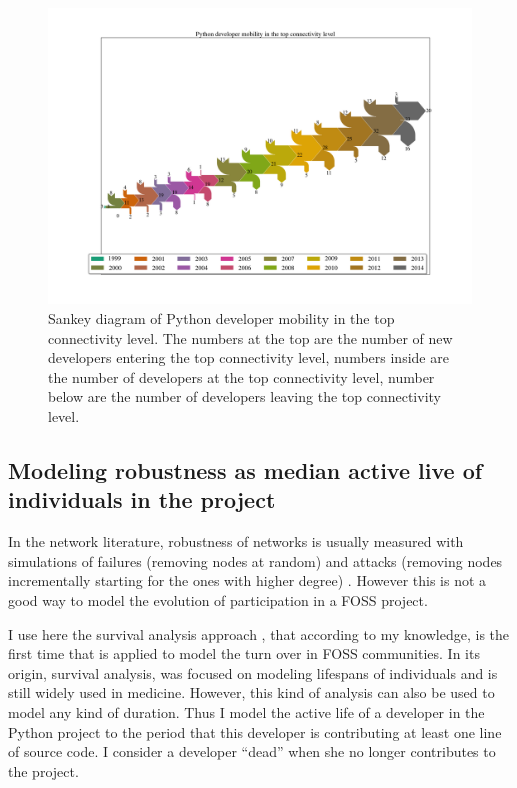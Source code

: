 \begin{landscape}
\begin{figure}[p]
\begin{center}
\includegraphics[scale=0.42]{figures/sankey_mobility_python_years}
\caption[Sankey diagram of Python developer mobility in the top connectivity level.]{Sankey diagram of Python developer mobility in the top connectivity level. The numbers at the top are the number of new developers entering the top connectivity level, numbers inside are the number of developers at the top connectivity level, number below are the number of developers leaving the top connectivity level.}
\label{fig:sankey}
\end{center}
\end{figure}
\end{landscape}


\subsection{Modeling robustness as median active live of individuals in the project}

In the network literature, robustness of networks is usually measured with simulations of failures (removing nodes at random) and attacks (removing nodes incrementally starting for the ones with higher degree) \citep{albert:2000}. However this is not a good way to model the evolution of participation in a FOSS project.

I use here the survival analysis approach \citep{miller:2011}, that according to my knowledge, is the first time that is applied to model the turn over in FOSS communities. In its origin, survival analysis, was focused on modeling lifespans of individuals and is still widely used in medicine. However, this kind of analysis can also be used to model any kind of duration. Thus I model the active life of a developer in the Python project to the period that this developer is contributing at least one line of source code. I consider a developer ``dead'' when she no longer contributes to the project.

